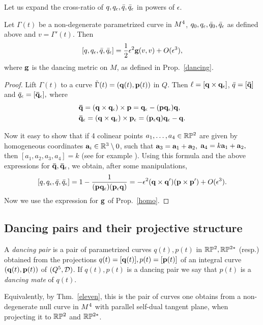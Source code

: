 \sn 
%

Let us expand the cross-ratio  of $q, q_\epsilon, \bar q, \bar q_\epsilon$ in powers of $\epsilon$. 

\begin{proposition}\label{cr} Let $\Gamma(t)$ be a non-degenerate parametrized curve in $M^4$, $q_0, q_\epsilon, \bar q_0, \bar q_\epsilon$ as defined above and  $v=\Gamma'(t)$. Then 
$$[q, q_\epsilon, \bar q, \bar q_\epsilon]={1\over 2}\epsilon^2\mathbf{ g} (v, v)+O(\epsilon^3),$$
where $\mathbf{ g}$ is the dancing metric on $M$, as defined in Prop.~\ref{dancing}. 
\end{proposition}


\begin{proof}  Lift $\Gamma(t)$ to a curve $\tilde \Gamma(t)=(\mathbf q(t), {\mathbf p}(t))$ in $Q$. Then $\ell=[\mathbf q\times\mathbf q_\epsilon]$, 
$\bar q=[\mathbf{\bar q}]$ and  $\bar q_\epsilon=[\mathbf{\bar q}_\epsilon],$ where 
%
\begin{align*}
&\mathbf{\bar q}=( \mathbf q\times\mathbf q_\epsilon)\times {\mathbf p}=\mathbf q_\epsilon-({\mathbf p}\mathbf q_\epsilon)\mathbf q,\\ 
&\mathbf{\bar q}_\epsilon=(\mathbf q\times\mathbf q_\epsilon)\times {\mathbf p}_\epsilon=({\mathbf p}_\epsilon\mathbf q)\mathbf q_\epsilon-\mathbf q.
\end{align*}


Now  it easy to show that if 4 colinear points $a_1,\ldots, a_4\in\mathbb{R}\mathbb{P}^2$ are given by  homogeneous coordinates  ${\bf a}_i\in\mathbb{R}^3\setminus 0$, such that  ${\bf a}_3={\bf a}_1+{\bf a}_2,$ ${\bf a}_4=k{\bf a}_1+{\bf a}_2,$ then 
  $ [a_1,a_2,a_3,a_4]=k$ (see for example \cite{K}). 
 Using this  formula and the above expressions for $\mathbf{\bar q}, \mathbf{\bar q}_\epsilon$, we obtain, after some manipulations, 
$$[q,q_\epsilon, \bar q, \bar q_\epsilon]=1-{1\over({\mathbf p}\mathbf q_\epsilon)({\mathbf p}_\epsilon\mathbf q)}=
-\epsilon^2(\mathbf q\times\mathbf q')({\mathbf p}\times{\mathbf p}')+O(\epsilon^3).$$
Now we use  the expression for $\mathbf{ g}$ of Prop.~\ref{homo}.
\end{proof}


\subsection{Dancing pairs and their projective structure}\label{pj}
\begin{definition}A  {\em dancing pair} is a pair of parametrized curves $q(t), p(t)$ in  $ \mathbb{R}\mathbb{P}^2, \mathbb{R}\mathbb{P}^{2*}$ (resp.)  
obtained from the projections $q(t)=[\mathbf q(t)], p(t)=[{\mathbf p}(t)]$ of an integral curve $(\mathbf q(t), {\mathbf p}(t))$ of $(Q^5,{\mathcal D})$. If $q(t), p(t)$ is a dancing pair we say that $p(t)$ is a {\em dancing mate} of $q(t)$. 
\end{definition}
Equivalently, by Thm.~\ref{eleven}, this is the pair of curves one obtains from a non-degenerate  null curve in $M^4$ with parallel self-dual tangent plane, when projecting it to $\mathbb{R}\mathbb{P}^2$ and $\mathbb{R}\mathbb{P}^{2*}$. 

